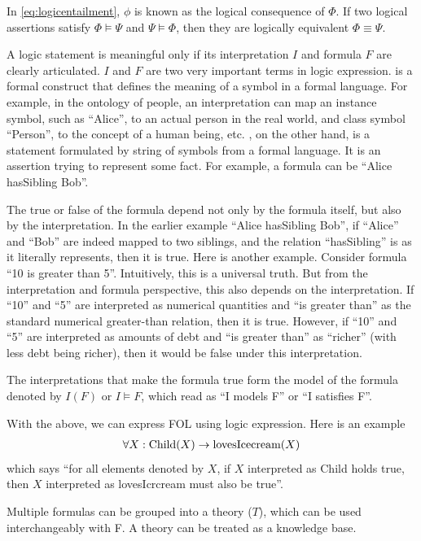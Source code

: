 In \eqref{eq:logicentailment}, $\phi$ is known as the logical consequence of $\Phi$. If two logical assertions satisfy $\Phi \models \Psi$ and $\Psi \models \Phi$, then they are logically equivalent $\Phi \equiv \Psi$.

A logic statement is meaningful only if its interpretation $I$ and formula $F$ are clearly articulated. $I$ and $F$ are two very important terms in logic expression.  is a formal construct that defines the meaning of a symbol in a formal language. For example, in the ontology of people, an interpretation can map an instance symbol, such as ``Alice'', to an actual person in the real world, and class symbol ``Person'', to the concept of a human being, etc. , on the other hand, is a statement formulated by string of symbols from a formal language. It is an assertion trying to represent some fact. For example, a formula can be ``Alice hasSibling Bob''. 

The true or false of the formula depend not only by the formula itself, but also by the interpretation. In the earlier example ``Alice hasSibling Bob'', if ``Alice'' and ``Bob'' are indeed mapped to two siblings, and the relation ``hasSibling'' is as it literally represents, then it is true. Here is another example. Consider formula ``10 is greater than 5''. Intuitively, this is a universal truth. But from the interpretation and formula perspective, this also depends on the interpretation. If ``10'' and ``5'' are interpreted as numerical quantities and ``is greater than'' as the standard numerical greater-than relation, then it is true. However, if ``10'' and ``5'' are interpreted as amounts of debt and ``is greater than'' as ``richer'' (with less debt being richer), then it would be false under this interpretation.

The interpretations that make the formula true form the model of the formula denoted by $I(F)$ or $I \models F$, which read as ``I models F'' or ``I satisfies F''. 

With the above, we can express FOL using logic expression. Here is an example
\begin{eqnarray}
	\forall X: \textup{Child}(X) \rightarrow \textup{lovesIcecream}(X) \nonumber
\end{eqnarray}
which says ``for all elements denoted by $X$, if $X$ interpreted as Child holds true, then $X$ interpreted as lovesIcrcream must also be true''.

Multiple formulas can be grouped into a theory ($T$), which can be used interchangeably with F. A theory can be treated as a knowledge base.

